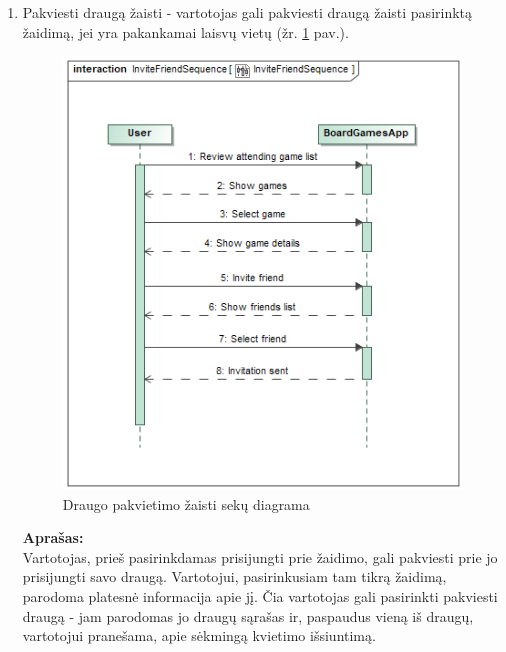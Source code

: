 \documentclass{VUMIFPSkursinis}
\begin{document}
\begin{enumerate}
			\item Pakviesti draugą žaisti - vartotojas gali pakviesti draugą žaisti 
			pasirinktą žaidimą, jei yra pakankamai laisvų vietų (žr. \ref{img:InviteFriendSequence} pav.).
				\begin{figure}[H]
					\centering
					\includegraphics[scale=0.5]{img/InviteFriendSequence}
					\caption{Draugo pakvietimo žaisti sekų diagrama}
					\label{img:InviteFriendSequence}
				\end{figure}
				\textbf{Aprašas:}\\
					Vartotojas, prieš pasirinkdamas prisijungti prie žaidimo, gali 
					pakviesti prie jo prisijungti savo draugą. Vartotojui, 
					pasirinkusiam tam tikrą žaidimą, parodoma platesnė informacija 
					apie jį. Čia vartotojas gali pasirinkti pakviesti draugą - 
					jam parodomas jo draugų sąrašas ir, paspaudus vieną iš draugų, 
					vartotojui pranešama, apie sėkmingą kvietimo išsiuntimą.
				

\end{enumerate}
\end{document}
